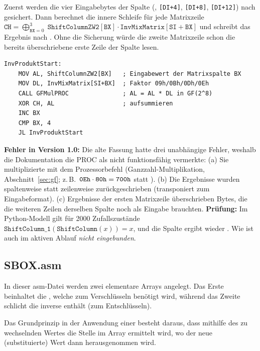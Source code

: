 Zuerst werden die vier Eingabebytes der Spalte (, \texttt{[DI+4]}, \texttt{[DI+8]}, \texttt{[DI+12]}) nach  gesichert. Dann berechnet die innere Schleife für jede Matrixzeile $\mathtt{CH}=\bigoplus_{\mathtt{BX}=0}^{3}\;\mathtt{ShiftColumnZW2[BX]}\cdot\mathtt{InvMixMatrix[SI+BX]}$ und schreibt das Ergebnis nach . Ohne die Sicherung würde die zweite Matrixzeile schon die bereits überschriebene erste Zeile der Spalte lesen.

\begin{lstlisting}[language=TASM,caption={Kern von \texttt{ShiftColumn\_1}: Produkt einer Matrixzeile},label={lst:sc1}]
InvProduktStart:
    MOV AL, ShiftColumnZW2[BX]   ; Eingabewert der Matrixspalte BX
    MOV DL, InvMixMatrix[SI+BX]  ; Faktor 09h/0Bh/0Dh/0Eh
    CALL GFMulPROC               ; AL = AL * DL in GF(2^8)
    XOR CH, AL                   ; aufsummieren
    INC BX
    CMP BX, 4
    JL InvProduktStart
\end{lstlisting}

\textbf{Fehler in Version 1.0:} Die alte Fassung hatte drei unabhängige Fehler, weshalb die Dokumentation die PROC als \glqq nicht funktionsfähig\grqq{} vermerkte: (a) Sie multiplizierte mit dem Prozessorbefehl  (Ganzzahl-Multiplikation, Abschnitt~\ref{sec:gf}; z.\,B.\ $\texttt{0Eh}\cdot\texttt{80h}=\texttt{700h}$ statt ). (b) Die Ergebnisse wurden spaltenweise statt zeilenweise zurückgeschrieben (transponiert zum Eingabeformat). (c) Ergebnisse der ersten Matrixzeile überschrieben Bytes, die die weiteren Zeilen derselben Spalte noch als Eingabe brauchten. \textbf{Prüfung:} Im Python-Modell gilt für 2000 Zufallszustände $\mathtt{ShiftColumn\_1}(\mathtt{ShiftColumn}(x))=x$, und die Spalte     ergibt wieder    . Wie  ist auch  im aktiven Ablauf \emph{nicht eingebunden}.

\subsection{SBOX.asm}\label{sec:sbox}
In dieser asm-Datei werden zwei elementare Arrays angelegt. Das Erste beinhaltet die , welche zum Verschlüsseln benötigt wird, während das Zweite schlicht die inverse  enthält (zum Entschlüsseln).

Das Grundprinzip in der Anwendung einer  besteht daraus, dass mithilfe des zu wechselnden Wertes die Stelle im Array ermittelt wird, wo der neue (substituierte) Wert dann herausgenommen wird.

